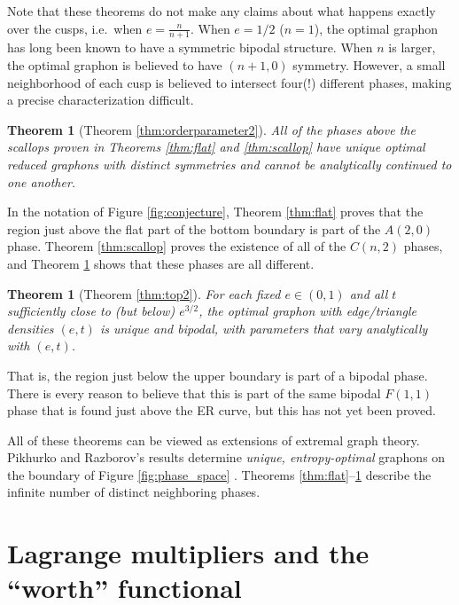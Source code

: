 \documentclass[12pt]{amsart}
\newtheorem{theorem}[lemma]{Theorem}
\newcommand{\Value}{worth}
\begin{document}
{Note that these theorems do not make any claims about what happens exactly over
the cusps, i.e.~when 
$e = \frac{n}{n+1}$. When $e=1/2$ ($n=1$), the optimal
graphon has long been known to have a symmetric bipodal structure. 
When $n$ is larger, the optimal graphon is believed to have $(n+1,0)$ symmetry. 
However, a small neighborhood of each cusp is believed to intersect four(!) 
different phases, making a precise characterization difficult. 

\begin{theorem}[Theorem \ref{thm:orderparameter2}] \label{thm:orderparameter}
All of the phases above the scallops proven in Theorems \ref{thm:flat} and \ref{thm:scallop} have unique optimal reduced graphons with distinct symmetries and cannot be analytically continued to one another.
\end{theorem}

In the notation of Figure \ref{fig:conjecture}, Theorem \ref{thm:flat}
proves that the region just above the flat part of the bottom boundary
is part of the $A(2,0)$ phase.  
Theorem \ref{thm:scallop} 
proves the existence of all of the $C(n,2)$ phases, and Theorem 
\ref{thm:orderparameter} shows that these phases are all different. 

\begin{theorem}[Theorem \ref{thm:top2}] \label{thm:top}
For each fixed $e \in (0,1)$ and all $t$ sufficiently close to (but below) $e^{3/2}$, the 
optimal graphon with edge/triangle densities $(e,t)$ is unique and bipodal, with parameters that vary analytically with $(e,t)$. 
\end{theorem}

\noindent That is, the region just below the upper boundary is part of a bipodal phase. There is every reason to
believe that this is part of the same bipodal $F(1,1)$ phase that is found just above the ER curve, but this has
not yet been proved. 

All of these theorems can be viewed as extensions of extremal graph theory. 
Pikhurko and Razborov's results \cite{PR} determine {\em unique, entropy-optimal} graphons on the boundary of Figure \ref{fig:phase_space} \cite{RS1}. Theorems \ref{thm:flat}--\ref{thm:top} 
describe the infinite number of distinct neighboring phases. 

\section{Lagrange multipliers and the ``\Value''
functional}\label{sec:Lagrange}

}
\end{document}
